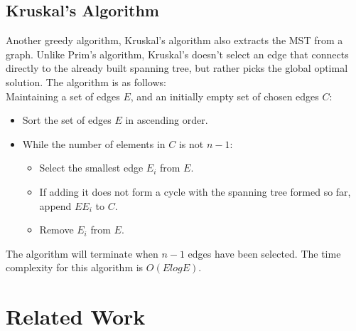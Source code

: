 \subsection{Kruskal's Algorithm}
Another greedy algorithm,  Kruskal's algorithm  also extracts the MST from a graph.  Unlike Prim's algorithm, Kruskal's doesn't select an edge that connects directly to the already built spanning tree, but rather picks the global optimal solution. The algorithm is as follows:\\
Maintaining a set of edges $E$, and an initially empty set of chosen edges $C$:
\begin{itemize}
\item Sort the set of edges $E$ in ascending order.
\item While the number of elements in $C$ is not $n-1$:
	\begin{itemize}
	\item Select the smallest edge $E_i$ from $E$.
	\item If adding it does not form a cycle with the spanning tree formed so far, append $EE_i$ to $C$.
	\item Remove $E_i$ from $E$.
	\end{itemize}
\end{itemize}
The algorithm will terminate when $n-1$ edges have been selected.  The time complexity for this algorithm is $O(ElogE)$.





\section{Related Work}

